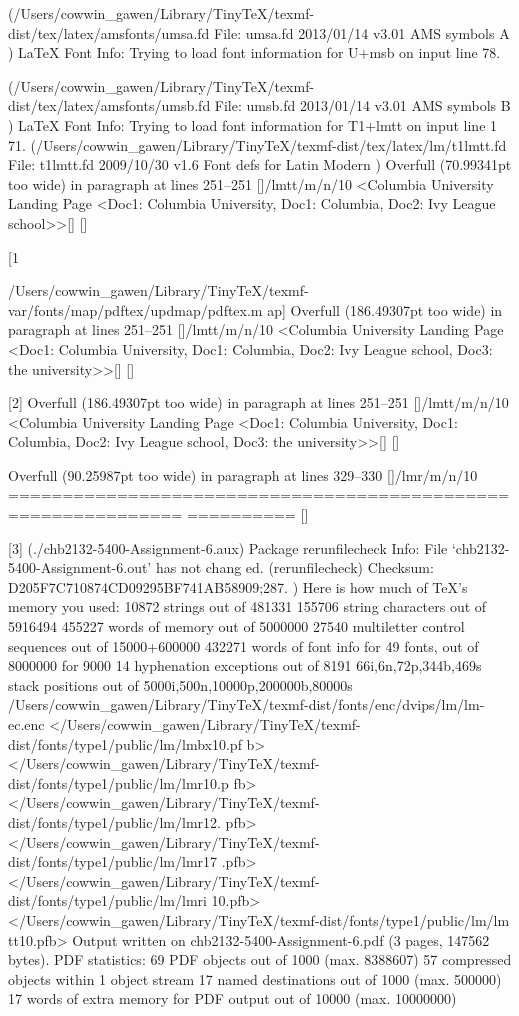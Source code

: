 (/Users/cowwin_gawen/Library/TinyTeX/texmf-dist/tex/latex/amsfonts/umsa.fd
File: umsa.fd 2013/01/14 v3.01 AMS symbols A
)
LaTeX Font Info:    Trying to load font information for U+msb on input line 78.

(/Users/cowwin_gawen/Library/TinyTeX/texmf-dist/tex/latex/amsfonts/umsb.fd
File: umsb.fd 2013/01/14 v3.01 AMS symbols B
)
LaTeX Font Info:    Trying to load font information for T1+lmtt on input line 1
71.
(/Users/cowwin_gawen/Library/TinyTeX/texmf-dist/tex/latex/lm/t1lmtt.fd
File: t1lmtt.fd 2009/10/30 v1.6 Font defs for Latin Modern
)
Overfull \hbox (70.99341pt too wide) in paragraph at lines 251--251
[]/lmtt/m/n/10 <Columbia University Landing Page <Doc1: Columbia University,
 Doc1: Columbia, Doc2: Ivy League school>>[] 
 []

[1

{/Users/cowwin_gawen/Library/TinyTeX/texmf-var/fonts/map/pdftex/updmap/pdftex.m
ap}]
Overfull \hbox (186.49307pt too wide) in paragraph at lines 251--251
[]/lmtt/m/n/10 <Columbia University Landing Page <Doc1: Columbia University,
 Doc1: Columbia, Doc2: Ivy League school, Doc3: the university>>[] 
 []

[2]
Overfull \hbox (186.49307pt too wide) in paragraph at lines 251--251
[]/lmtt/m/n/10 <Columbia University Landing Page <Doc1: Columbia University,
 Doc1: Columbia, Doc2: Ivy League school, Doc3: the university>>[] 
 []


Overfull \hbox (90.25987pt too wide) in paragraph at lines 329--330
[]/lmr/m/n/10 ==============================================================
========== 
 []

[3] (./chb2132-5400-Assignment-6.aux)
Package rerunfilecheck Info: File `chb2132-5400-Assignment-6.out' has not chang
ed.
(rerunfilecheck)             Checksum: D205F7C710874CD09295BF741AB58909;287.
 ) 
Here is how much of TeX's memory you used:
 10872 strings out of 481331
 155706 string characters out of 5916494
 455227 words of memory out of 5000000
 27540 multiletter control sequences out of 15000+600000
 432271 words of font info for 49 fonts, out of 8000000 for 9000
 14 hyphenation exceptions out of 8191
 66i,6n,72p,344b,469s stack positions out of 5000i,500n,10000p,200000b,80000s
{/Users/cowwin_gawen/Library/TinyTeX/texmf-dist/fonts/enc/dvips/lm/lm-ec.enc}
</Users/cowwin_gawen/Library/TinyTeX/texmf-dist/fonts/type1/public/lm/lmbx10.pf
b></Users/cowwin_gawen/Library/TinyTeX/texmf-dist/fonts/type1/public/lm/lmr10.p
fb></Users/cowwin_gawen/Library/TinyTeX/texmf-dist/fonts/type1/public/lm/lmr12.
pfb></Users/cowwin_gawen/Library/TinyTeX/texmf-dist/fonts/type1/public/lm/lmr17
.pfb></Users/cowwin_gawen/Library/TinyTeX/texmf-dist/fonts/type1/public/lm/lmri
10.pfb></Users/cowwin_gawen/Library/TinyTeX/texmf-dist/fonts/type1/public/lm/lm
tt10.pfb>
Output written on chb2132-5400-Assignment-6.pdf (3 pages, 147562 bytes).
PDF statistics:
 69 PDF objects out of 1000 (max. 8388607)
 57 compressed objects within 1 object stream
 17 named destinations out of 1000 (max. 500000)
 17 words of extra memory for PDF output out of 10000 (max. 10000000)
